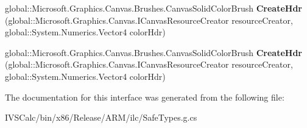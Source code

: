 \begin{DoxyCompactItemize}
\item 
\mbox{\label{interface_microsoft_1_1_graphics_1_1_canvas_1_1_brushes_1_1_i_canvas_solid_color_brush_statics_a51d5d5880725d4fdbdadacea96f02cb0}} 
global\+::\+Microsoft.\+Graphics.\+Canvas.\+Brushes.\+Canvas\+Solid\+Color\+Brush {\bfseries Create\+Hdr} (global\+::\+Microsoft.\+Graphics.\+Canvas.\+I\+Canvas\+Resource\+Creator resource\+Creator, global\+::\+System.\+Numerics.\+Vector4 color\+Hdr)
\item 
\mbox{\label{interface_microsoft_1_1_graphics_1_1_canvas_1_1_brushes_1_1_i_canvas_solid_color_brush_statics_a51d5d5880725d4fdbdadacea96f02cb0}} 
global\+::\+Microsoft.\+Graphics.\+Canvas.\+Brushes.\+Canvas\+Solid\+Color\+Brush {\bfseries Create\+Hdr} (global\+::\+Microsoft.\+Graphics.\+Canvas.\+I\+Canvas\+Resource\+Creator resource\+Creator, global\+::\+System.\+Numerics.\+Vector4 color\+Hdr)
\end{DoxyCompactItemize}


The documentation for this interface was generated from the following file\+:\begin{DoxyCompactItemize}
\item 
I\+V\+S\+Calc/bin/x86/\+Release/\+A\+R\+M/ilc/Safe\+Types.\+g.\+cs\end{DoxyCompactItemize}
